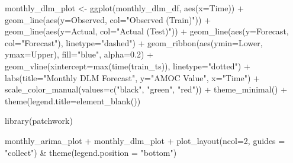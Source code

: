 \documentclass[
  11pt,
]{article}
\newenvironment{Shaded}{\begin{snugshade}}{\end{snugshade}}
\newcommand{\AttributeTok}[1]{\textcolor[rgb]{0.40,0.45,0.13}{#1}}
\newcommand{\DecValTok}[1]{\textcolor[rgb]{0.68,0.00,0.00}{#1}}
\newcommand{\FloatTok}[1]{\textcolor[rgb]{0.68,0.00,0.00}{#1}}
\newcommand{\FunctionTok}[1]{\textcolor[rgb]{0.28,0.35,0.67}{#1}}
\newcommand{\NormalTok}[1]{\textcolor[rgb]{0.00,0.23,0.31}{#1}}
\newcommand{\OtherTok}[1]{\textcolor[rgb]{0.00,0.23,0.31}{#1}}
\newcommand{\SpecialCharTok}[1]{\textcolor[rgb]{0.37,0.37,0.37}{#1}}
\newcommand{\StringTok}[1]{\textcolor[rgb]{0.13,0.47,0.30}{#1}}
\begin{document}
\begin{Shaded}
\begin{Highlighting}[]
\NormalTok{monthly\_dlm\_plot }\OtherTok{\textless{}{-}} \FunctionTok{ggplot}\NormalTok{(monthly\_dlm\_df, }\FunctionTok{aes}\NormalTok{(}\AttributeTok{x=}\NormalTok{Time)) }\SpecialCharTok{+}
  \FunctionTok{geom\_line}\NormalTok{(}\FunctionTok{aes}\NormalTok{(}\AttributeTok{y=}\NormalTok{Observed, }\AttributeTok{col=}\StringTok{"Observed (Train)"}\NormalTok{)) }\SpecialCharTok{+}
  \FunctionTok{geom\_line}\NormalTok{(}\FunctionTok{aes}\NormalTok{(}\AttributeTok{y=}\NormalTok{Actual, }\AttributeTok{col=}\StringTok{"Actual (Test)"}\NormalTok{)) }\SpecialCharTok{+}
  \FunctionTok{geom\_line}\NormalTok{(}\FunctionTok{aes}\NormalTok{(}\AttributeTok{y=}\NormalTok{Forecast, }\AttributeTok{col=}\StringTok{"Forecast"}\NormalTok{), }\AttributeTok{linetype=}\StringTok{"dashed"}\NormalTok{) }\SpecialCharTok{+}
  \FunctionTok{geom\_ribbon}\NormalTok{(}\FunctionTok{aes}\NormalTok{(}\AttributeTok{ymin=}\NormalTok{Lower, }\AttributeTok{ymax=}\NormalTok{Upper), }\AttributeTok{fill=}\StringTok{"blue"}\NormalTok{, }\AttributeTok{alpha=}\FloatTok{0.2}\NormalTok{) }\SpecialCharTok{+}
  \FunctionTok{geom\_vline}\NormalTok{(}\AttributeTok{xintercept=}\FunctionTok{max}\NormalTok{(}\FunctionTok{time}\NormalTok{(train\_ts)), }\AttributeTok{linetype=}\StringTok{"dotted"}\NormalTok{) }\SpecialCharTok{+}
  \FunctionTok{labs}\NormalTok{(}\AttributeTok{title=}\StringTok{"Monthly DLM Forecast"}\NormalTok{, }\AttributeTok{y=}\StringTok{"AMOC Value"}\NormalTok{, }\AttributeTok{x=}\StringTok{"Time"}\NormalTok{) }\SpecialCharTok{+}
  \FunctionTok{scale\_color\_manual}\NormalTok{(}\AttributeTok{values=}\FunctionTok{c}\NormalTok{(}\StringTok{"black"}\NormalTok{, }\StringTok{"green"}\NormalTok{, }\StringTok{"red"}\NormalTok{)) }\SpecialCharTok{+}
  \FunctionTok{theme\_minimal}\NormalTok{() }\SpecialCharTok{+}
  \FunctionTok{theme}\NormalTok{(}\AttributeTok{legend.title=}\FunctionTok{element\_blank}\NormalTok{())}
\end{Highlighting}
\end{Shaded}

\begin{Shaded}
\begin{Highlighting}[]
\FunctionTok{library}\NormalTok{(patchwork)}

\NormalTok{monthly\_arima\_plot }\SpecialCharTok{+}\NormalTok{ monthly\_dlm\_plot }\SpecialCharTok{+} 
  \FunctionTok{plot\_layout}\NormalTok{(}\AttributeTok{ncol=}\DecValTok{2}\NormalTok{, }\AttributeTok{guides =} \StringTok{"collect"}\NormalTok{) }\SpecialCharTok{\&} 
  \FunctionTok{theme}\NormalTok{(}\AttributeTok{legend.position =} \StringTok{"bottom"}\NormalTok{)}
\end{Highlighting}
\end{Shaded}
\end{document}

